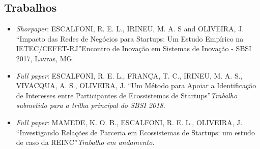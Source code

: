 
\begin{apendicesenv}

\partapendices

\chapter{Trabalhos}
\label{shortpaperEISI2017}
\begin{itemize}
	\item \textit{Shorpaper}: ESCALFONI, R. E. L., IRINEU, M. A. S and OLIVEIRA, J. \textquotedblleft Impacto das Redes de Negócios para Startups: Um Estudo Empírico na IETEC/CEFET-RJ\textquotedblright Encontro de Inovação em Sistemas de Inovação - SBSI 2017, Lavras, MG.
	\item \textit{Full paper}: ESCALFONI, R. E. L., FRANÇA, T. C., IRINEU, M. A. S., VIVACQUA, A. S., OLIVEIRA, J. \textquotedblleft Um Método para Apoiar a Identificação de Interesses entre Participantes de Ecossistemas de Startups\textquotedblright \textit{Trabalho submetido para a trilha principal do SBSI 2018.}
	\item \textit{Full paper}: MAMEDE, K. O. B., ESCALFONI, R. E. L., OLIVEIRA, J. \textquotedblleft Investigando Relações de Parceria em Ecossistemas de Startups: um estudo de caso da REINC\textquotedblright \textit{Trabalho em andamento.}

\end{itemize}
\\







\end{apendicesenv}
